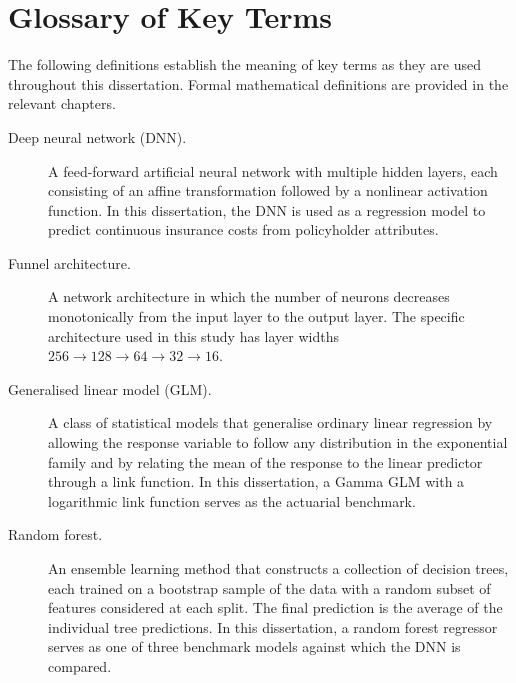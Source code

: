 \section{Glossary of Key Terms}
\label{annexure:glossary}

The following definitions establish the meaning of key terms as they are
used throughout this dissertation.  Formal mathematical definitions are
provided in the relevant chapters.

\begin{description}
    \item[Deep neural network (DNN).]  A feed-forward artificial neural
          network with multiple hidden layers, each consisting of an
          affine transformation followed by a nonlinear activation
          function.  In this dissertation, the DNN is used as a
          regression model to predict continuous insurance costs from
          policyholder attributes.

    \item[Funnel architecture.]  A network architecture in which the
          number of neurons decreases monotonically from the input layer
          to the output layer.  The specific architecture used in this
          study has layer widths $256 \to 128 \to 64 \to 32 \to 16$.

    \item[Generalised linear model (GLM).]  A class of statistical
          models that generalise ordinary linear regression by allowing
          the response variable to follow any distribution in the
          exponential family and by relating the mean of the response to
          the linear predictor through a link function.  In this
          dissertation, a Gamma GLM with a logarithmic link function
          serves as the actuarial benchmark.

    \item[Random forest.]  An ensemble learning method that constructs a
          collection of decision trees, each trained on a bootstrap
          sample of the data with a random subset of features considered
          at each split.  The final prediction is the average of the
          individual tree predictions.  In this dissertation, a random
          forest regressor serves as one of three benchmark models
          against which the DNN is compared.


\end{description}
